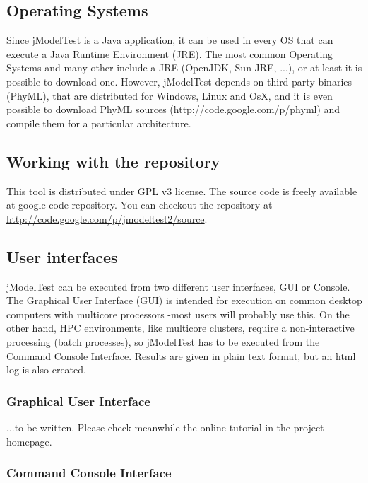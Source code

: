 \documentclass[11pt,twoside,a4paper]{article}
\begin{document}
\subsection{Operating Systems}

Since jModelTest is a Java application, it can be used in every OS that can execute a Java Runtime Environment (JRE). The most common Operating Systems and many other include a JRE (OpenJDK, Sun JRE, ...), or at least it is possible to download one. However, jModelTest depends on third-party binaries (PhyML), that are distributed for Windows, Linux and OsX, and it is even possible to download PhyML sources (http://code.google.com/p/phyml) and compile them for a particular architecture.

\subsection{Working with the repository}

This tool is distributed under GPL v3 license. The source code is freely available at google code repository. You can checkout the repository at \url{http://code.google.com/p/jmodeltest2/source}.

\subsection{User interfaces}

jModelTest can be executed from two different user interfaces, GUI or Console. The Graphical User Interface (GUI) is intended for execution on common desktop computers with multicore processors -most users will probably use this. On the other hand, HPC environments, like multicore clusters, require a non-interactive processing (batch processes), so jModelTest has to be executed from the Command Console Interface. Results are given in plain text format, but an html log is also created.

\subsubsection{Graphical User Interface}

...to be written. Please check meanwhile the online tutorial in the project homepage.

\subsubsection{Command Console Interface}
\end{document}
